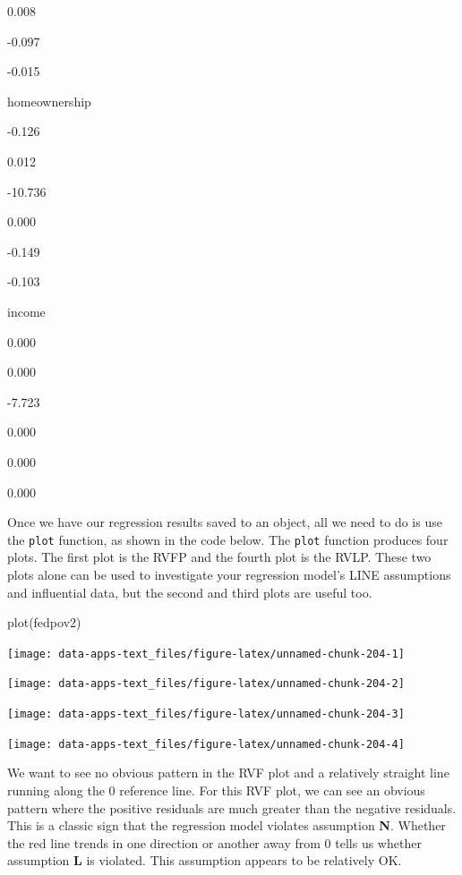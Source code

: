 \documentclass[
]{book}
\makeatletter
\newenvironment{Shaded}{\begin{snugshade}}{\end{snugshade}}
\newcommand{\FunctionTok}[1]{\textcolor[rgb]{0,0,0}{#1}}
\newcommand{\NormalTok}[1]{#1}
\newenvironment{kframe}{%
\medskip{}
\setlength{\fboxsep}{.8em}
 \def\at@end@of@kframe{}%
 \ifinner\ifhmode%
  \def\at@end@of@kframe{\end{minipage}}%
  \begin{minipage}{\columnwidth}%
 \fi\fi%
 \def\FrameCommand##1{\hskip\@totalleftmargin \hskip-\fboxsep
 \colorbox{shadecolor}{##1}\hskip-\fboxsep
     \hskip-\linewidth \hskip-\@totalleftmargin \hskip\columnwidth}%
 \MakeFramed {\advance\hsize-\width
   \@totalleftmargin\z@ \linewidth\hsize
   \@setminipage}}%
 {\par\unskip\endMakeFramed%
 \at@end@of@kframe}
\renewenvironment{Shaded}{\begin{kframe}}{\end{kframe}}
\makeatother
\begin{document}
0.008

-0.097

-0.015

homeownership

-0.126

0.012

-10.736

0.000

-0.149

-0.103

income

0.000

0.000

-7.723

0.000

0.000

0.000

Once we have our regression results saved to an object, all we need to do is use the \texttt{plot} function, as shown in the code below. The \texttt{plot} function produces four plots. The first plot is the RVFP and the fourth plot is the RVLP. These two plots alone can be used to investigate your regression model's LINE assumptions and influential data, but the second and third plots are useful too.

\begin{Shaded}
\begin{Highlighting}[]
\FunctionTok{plot}\NormalTok{(fedpov2)}
\end{Highlighting}
\end{Shaded}

\begin{center}\texttt{[image: data-apps-text\_files/figure-latex/unnamed-chunk-204-1]} \end{center}

\begin{center}\texttt{[image: data-apps-text\_files/figure-latex/unnamed-chunk-204-2]} \end{center}

\begin{center}\texttt{[image: data-apps-text\_files/figure-latex/unnamed-chunk-204-3]} \end{center}

\begin{center}\texttt{[image: data-apps-text\_files/figure-latex/unnamed-chunk-204-4]} \end{center}

We want to see no obvious pattern in the RVF plot and a relatively straight line running along the 0 reference line. For this RVF plot, we can see an obvious pattern where the positive residuals are much greater than the negative residuals. This is a classic sign that the regression model violates assumption \textbf{N}. Whether the red line trends in one direction or another away from 0 tells us whether assumption \textbf{L} is violated. This assumption appears to be relatively OK.
\end{document}

